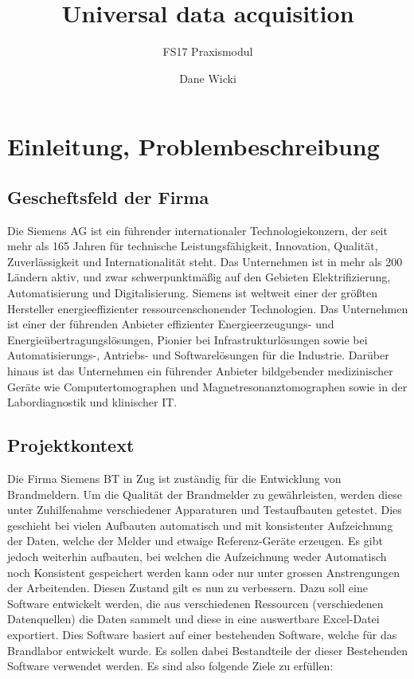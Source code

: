 \documentclass[10pt]{scrartcl}
\author{Dane Wicki}
\title{Universal data acquisition}
\subtitle{FS17 Praxismodul}
\begin{document}
\maketitle
\tableofcontents
\newpage

\section{Einleitung, Problembeschreibung}
\subsection{Gescheftsfeld der Firma}
Die Siemens AG ist ein führender internationaler Technologiekonzern, der seit mehr als 165 Jahren für technische Leistungsfähigkeit, Innovation, Qualität, Zuverlässigkeit und Internationalität steht. Das Unternehmen ist in mehr als 200 Ländern aktiv, und zwar schwerpunktmäßig auf den Gebieten Elektrifizierung, Automatisierung und Digitalisierung. Siemens ist weltweit einer der größten Hersteller energieeffizienter ressourcenschonender Technologien. Das Unternehmen ist einer der führenden Anbieter effizienter Energieerzeugungs- und Energieübertragungslösungen, Pionier bei Infrastrukturlösungen sowie bei Automatisierungs-, Antriebs- und Softwarelösungen für die Industrie. Darüber hinaus ist das Unternehmen ein führender Anbieter bildgebender medizinischer Geräte wie Computertomographen und Magnetresonanztomographen sowie in der Labordiagnostik und klinischer IT.
\subsection{Projektkontext}
Die Firma Siemens BT in Zug ist zuständig für die Entwicklung von Brandmeldern.
Um die Qualität der Brandmelder zu gewährleisten, werden diese unter Zuhilfenahme
verschiedener Apparaturen und Testaufbauten getestet. Dies geschieht bei vielen Aufbauten automatisch und mit konsistenter Aufzeichnung der Daten, welche der Melder und etwaige Referenz-Geräte erzeugen. Es gibt jedoch weiterhin aufbauten, bei welchen die Aufzeichnung weder Automatisch noch Konsistent gespeichert werden kann oder nur unter grossen Anstrengungen der Arbeitenden. Diesen Zustand gilt es nun zu verbessern.
Dazu soll eine Software entwickelt werden, die aus verschiedenen Ressourcen (verschiedenen
Datenquellen) die Daten sammelt und diese in eine auswertbare Excel-Datei exportiert. Dies
Software basiert auf einer bestehenden Software, welche für das Brandlabor entwickelt wurde.
Es sollen dabei Bestandteile der dieser Bestehenden Software verwendet werden.
Es sind also folgende Ziele zu erfüllen:
\end{document}
